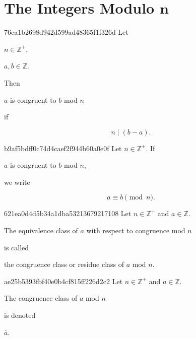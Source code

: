 \section{The Integers Modulo \({ \mathbf{n} }\)}
\begin{note}{76ca1b2698d942d599ad48365f1f326d}
    Let \begin{icloze}{3}\({ n \in \mathbb Z^{+} }\),\end{icloze} \begin{icloze}{4}\({ a, b \in \mathbb Z }\).\end{icloze}
    Then \begin{icloze}{2}\({ a }\) is congruent to \({ b }\) mod \({ n }\)\end{icloze} if
    \begin{icloze}{1}
        \[
            n \mid (b - a).
        \]
    \end{icloze}
\end{note}

\begin{note}{b9af5bdff0c74d4caef2f944b60a0e0f}
    Let \({ n \in \mathbb Z^{+} }\).
    If \begin{icloze}{2}\({ a }\) is congruent to \({ b }\) mod \({ n }\),\end{icloze} we write
    \begin{icloze}{1}
        \[
            a \equiv b \pmod n.
        \]
    \end{icloze}
\end{note}

\begin{note}{621ea0d4d5b34a1dba53213679217108}
    Let \({ n \in \mathbb Z^{+} }\) and \({ a \in \mathbb Z }\).
    \begin{icloze}{1}The equivalence class of \({ a }\) with respect to congruence mod \({ n }\)\end{icloze} is called \begin{icloze}{2}the congruence class or residue class of \({ a }\) mod \({ n }\).\end{icloze}
\end{note}

\begin{note}{ae25b5393fbf40e0b4cf815ff226d2c2}
    Let \({ n \in \mathbb Z^{+} }\) and \({ a \in \mathbb Z }\).
    \begin{icloze}{2}The congruence class of \({ a }\) mod \({ n }\)\end{icloze} is denoted \begin{icloze}{1}\({ \bar a }\).\end{icloze}
\end{note}

